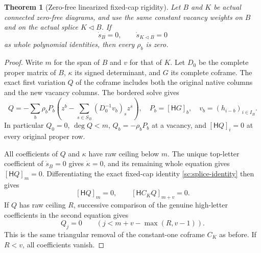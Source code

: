 \documentclass[11pt,a4paper]{amsart}
\numberwithin{equation}{section}
\theoremstyle{plain}
\newtheorem{theorem}{Theorem}[section]
\theoremstyle{definition}
\begin{document}
\begin{theorem}[Zero-free linearized fixed-cap rigidity]
\label{sc:linearized-cap}
Let \(B\) and \(K\) be actual connected zero-free diagrams, and use the
same constant vacancy weights on \(B\) and on the actual splice
\(K\triangleleft B\).  If
\[
 \dot s_B=0,\qquad \dot s_{K\triangleleft B}=0
\]
as whole polynomial identities, then every \(\rho_b\) is zero.
\end{theorem}
\begin{proof}
Write \(m\) for the span of \(B\) and \(v\) for that of \(K\).
Let \(D_0\) be the complete proper matrix of \(B\), \(\kappa\) its signed
determinant, and \(G\) its complete coframe.  The exact first variation
\(Q\) of the coframe includes both the original native columns and
the new vacancy columns.  The bordered solve gives
\begin{equation}\label{sc:linearized-coframe}
 Q=-\sum_b\rho_bP_b
 \left(z^b-\sum_{s\in S_B}(D_0^{-1}v_b)_sz^s\right),
 \quad P_b=[\mathsf HG]_b,\quad v_b=(h_{i-b})_{i\in I_B}.
\end{equation}
In particular \(Q_0=0\), \(\deg Q<m\), \(Q_b=-\rho_bP_b\) at a
vacancy, and \([\mathsf HQ]_i=0\) at every original proper row.

All coefficients of \(Q\) and \(\kappa\) have raw ceiling below \(m\).
The unique top-letter coefficient of \(\dot s_B=0\) gives
\(\dot\kappa=0\), and its remaining whole equation gives
\([\mathsf HQ]_m=0\).  Differentiating the exact fixed-cap identity
\eqref{sc:splice-identity} then gives
\begin{equation}\label{sc:linearized-observations}
 [\mathsf HQ]_m=0,
 \qquad [\mathsf HC_KQ]_{m+v}=0.
\end{equation}
If \(Q\) has raw ceiling \(R\), successive comparison of the genuine
high-letter coefficients in the second equation gives
\begin{equation}\label{sc:linearized-zero-range}
 Q_j=0\qquad(j<m+v-\max(R,v-1)).
\end{equation}
This is the same triangular removal of the constant-one coframe
\(C_K\) as before.  If \(R<v\), all coefficients vanish.


\end{proof}
\end{document}
